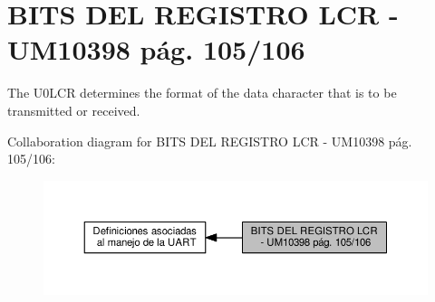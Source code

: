 \hypertarget{group___l_c_r_b_i_t_s}{}\section{B\+I\+TS D\+EL R\+E\+G\+I\+S\+T\+RO L\+CR -\/ U\+M10398 pág. 105/106}
\label{group___l_c_r_b_i_t_s}


The U0\+L\+CR determines the format of the data character that is to be transmitted or received.  


Collaboration diagram for B\+I\+TS D\+EL R\+E\+G\+I\+S\+T\+RO L\+CR -\/ U\+M10398 pág. 105/106\+:\nopagebreak
\begin{figure}[H]
\begin{center}
\leavevmode
\includegraphics[width=350pt]{group___l_c_r_b_i_t_s}
\end{center}
\end{figure}
